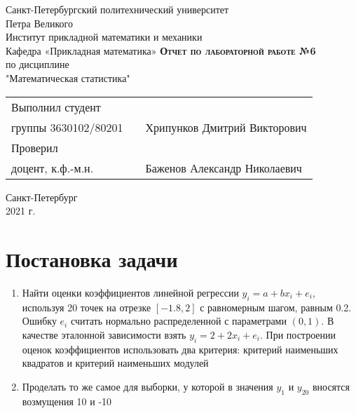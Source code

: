 \documentclass[12pt,a4paper]{article}
\begin{document}
    \begin{titlepage}
        \begin{center}
            \large
            Санкт-Петербургский политехнический университет\\Петра Великого\\
            \vspace{0.5cm}
            Институт прикладной математики и механики\\
            \vspace{0.25cm}
            Кафедра «Прикладная математика»
            \vfill
            \textsc{\LARGE\textbf{Отчет по лабораторной работе №6}}\\[5mm]
            \Large
            по дисциплине\\"Математическая статистика"
        \end{center}
        \vfill
        \begin{tabular}{l p{175pt} l}
            Выполнил студент \\ группы 3630102/80201 && Хрипунков Дмитрий Викторович
            \vspace{0.25cm}
            \\Проверил \\ доцент, к.ф.-м.н. && Баженов Александр Николаевич
        \end{tabular}
        \vfill
        \begin{center}
            Санкт-Петербург \\ 2021 г.
        \end{center}
    \end{titlepage}
    
\newpage
\begin{center}
    \tableofcontents
    \setcounter{page}{2}
\end{center}
\newpage
\begin{center}
    \listoffigures
\end{center}

\newpage
\section{Постановка задачи}
\begin{enumerate}
    \item Найти оценки коэффициентов линейной регрессии $y_i=a+bx_i+e_i$, используя 20 точек на отрезке $[-1.8,2]$ с равномерным шагом, равным 0.2. Ошибку $e_i$ считать нормально распределенной с параметрами $(0,1)$. В качестве эталонной зависимости взять $y_i=2+2x_i+e_i$. При построении оценок коэффициентов использовать два критерия: критерий наименьших квадратов и критерий наименьших модулей
    \item Проделать то же самое для выборки, у которой в значения $y_1$ и $y_{20}$ вносятся возмущения 10 и -10
\end{enumerate}
\end{document}
